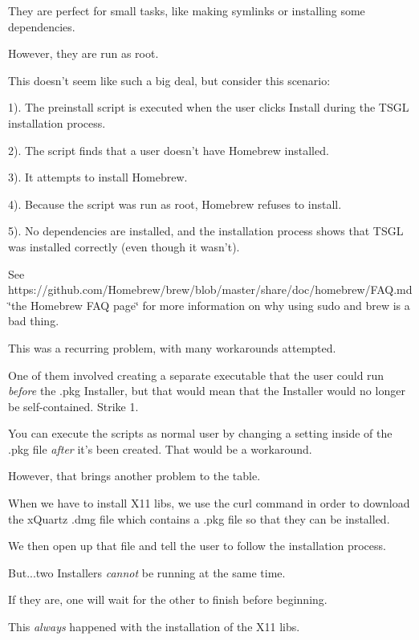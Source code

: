 They are perfect for small tasks, like making symlinks or installing some dependencies.

However, they are run as {\ttfamily root}.

This doesn't seem like such a big deal, but consider this scenario\-:

1). The {\ttfamily preinstall} script is executed when the user clicks {\ttfamily Install} during the T\-S\-G\-L installation process.

2). The script finds that a user doesn't have {\ttfamily Homebrew} installed.

3). It attempts to install {\ttfamily Homebrew}.

4). Because the script was run as {\ttfamily root}, {\ttfamily Homebrew} refuses to install.

5). No dependencies are installed, and the installation process shows that T\-S\-G\-L was installed correctly (even though it wasn't).

See https\-://github.com/\-Homebrew/brew/blob/master/share/doc/homebrew/\-F\-A\-Q.\-md \char`\"{}the Homebrew F\-A\-Q page\char`\"{} for more information on why using {\ttfamily sudo} and {\ttfamily brew} is a bad thing.

This was a recurring problem, with many workarounds attempted.

One of them involved creating a separate executable that the user could run {\itshape before} the {\ttfamily .pkg} Installer, but that would mean that the Installer would no longer be self-\/contained. Strike 1.

You can execute the scripts as normal user by changing a setting inside of the {\ttfamily .pkg} file {\itshape after} it's been created. That would be a workaround.

However, that brings another problem to the table.

When we have to install {\ttfamily X11} libs, we use the {\ttfamily curl} command in order to download the {\ttfamily x\-Quartz} {\ttfamily .dmg} file which contains a {\ttfamily .pkg} file so that they can be installed.

We then open up that file and tell the user to follow the installation process.

But...two Installers {\itshape cannot} be running at the same time.

If they are, one will wait for the other to finish before beginning.

This {\itshape always} happened with the installation of the {\ttfamily X11} libs.

